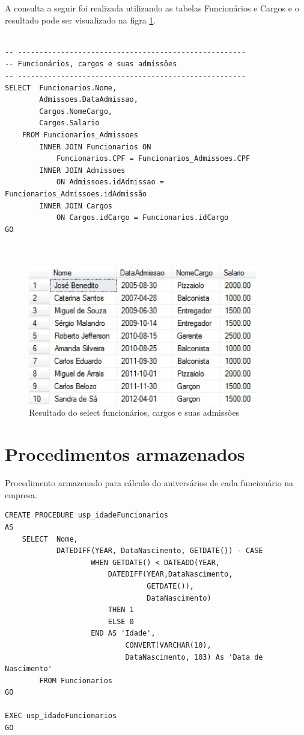 \documentclass[
	12pt,				%
	openright,			%
	oneside,			%
	a4paper,			%
	chapter=TITLE,		%
	section=TITLE,		%
	english,			%
	brazil				%
	]{abntex2}
\begin{document}
    A consulta a seguir foi realizada utilizando as tabelas Funcionários e Cargos
    e o resultado pode ser visualizado na figra \ref{select08}. 
    \begin{lstlisting}
    
-- -----------------------------------------------------
-- Funcionários, cargos e suas admissões
-- -----------------------------------------------------
SELECT  Funcionarios.Nome, 
        Admissoes.DataAdmissao, 
        Cargos.NomeCargo, 
        Cargos.Salario 
    FROM Funcionarios_Admissoes
	    INNER JOIN Funcionarios ON 
	        Funcionarios.CPF = Funcionarios_Admissoes.CPF 
	    INNER JOIN Admissoes 
	        ON Admissoes.idAdmissao = Funcionarios_Admissoes.idAdmissão 
	    INNER JOIN Cargos 
	        ON Cargos.idCargo = Funcionarios.idCargo
GO

    
    \end{lstlisting}
    \begin{figure}[h]
         \centering
         \includegraphics[width=10cm,keepaspectratio]{Imgs/Select_008}
         \caption{Resultado do select funcionários, cargos e suas admissões}
         \label{select08}
    \end{figure}
    
    \newpage
       
\section{Procedimentos armazenados}

    Procedimento armazenado para cálculo do aniversários de cada funcionário na empresa.
    \begin{lstlisting}
CREATE PROCEDURE usp_idadeFuncionarios
AS
	SELECT  Nome, 
	        DATEDIFF(YEAR, DataNascimento, GETDATE()) - CASE 
					WHEN GETDATE() < DATEADD(YEAR, 
					    DATEDIFF(YEAR,DataNascimento, 
                                 GETDATE()), 
				                 DataNascimento)
						THEN 1
						ELSE 0
					END AS 'Idade',  
					        CONVERT(VARCHAR(10), 
					        DataNascimento, 103) As 'Data de Nascimento'
    	FROM Funcionarios
GO

EXEC usp_idadeFuncionarios
GO
    \end{lstlisting}
    
\end{document}

